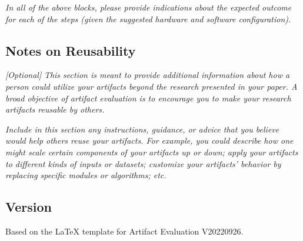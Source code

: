\emph{In all of the above blocks, please provide indications about the
expected outcome for each of the steps (given the suggested hardware
and software configuration).}


\subsection{Notes on Reusability}

\emph{[Optional]}
%
\emph{This section is meant to provide additional information about
how a person could utilize your artifacts beyond the research
presented in your paper.  A broad objective of artifact evaluation is
to encourage you to make your research artifacts reusable by others.}

\emph{Include in this section any instructions, guidance, or advice
that you believe would help others reuse your artifacts.  For example,
you could describe how one might scale certain components of your
artifacts up or down; apply your artifacts to different kinds of
inputs or datasets; customize your artifacts' behavior by replacing
specific modules or algorithms; etc.}


\subsection{Version}
Based on the LaTeX template for Artifact Evaluation V20220926.







